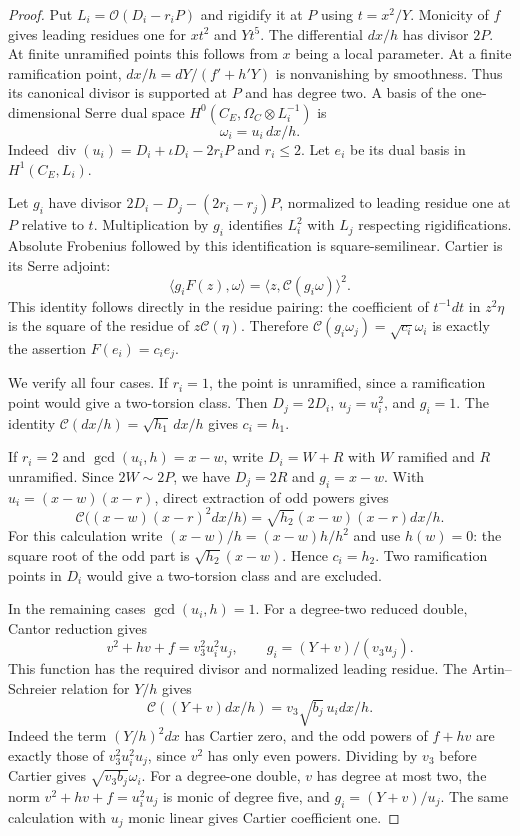 \begin{proof}
Put $L_i=\mathcal O(D_i-r_iP)$ and rigidify it at $P$ using
$t=x^2/Y$. Monicity of $f$ gives leading residues one for $xt^2$
and $Yt^5$. The differential $dx/h$ has divisor $2P$.
At finite unramified points this follows from $x$ being a local
parameter. At a finite ramification point,
$dx/h=dY/(f'+h'Y)$ is nonvanishing by smoothness.
Thus its canonical divisor is supported at $P$ and has degree two.
A basis of the one-dimensional Serre dual space
$H^0(C_E,\Omega_C\otimes L_i^{-1})$ is
\[
                            \omega_i=u_i\,dx/h.
\]
Indeed $\operatorname{div}(u_i)=D_i+\iota D_i-2r_iP$ and $r_i\le2$.
Let $e_i$ be its dual basis in $H^1(C_E,L_i)$.

Let $g_i$ have divisor $2D_i-D_j-(2r_i-r_j)P$, normalized to
leading residue one at $P$ relative to $t$.
Multiplication by $g_i$ identifies $L_i^2$ with $L_j$ respecting
rigidifications. Absolute Frobenius followed by this identification
is square-semilinear. Cartier is its Serre adjoint:
\[
 \langle g_iF(z),\omega\rangle
             =\langle z,\mathcal C(g_i\omega)\rangle^2.
\]
This identity follows directly in the residue pairing: the coefficient
of $t^{-1}dt$ in $z^2\eta$ is the square of the residue of
$z\mathcal C(\eta)$. Therefore
$\mathcal C(g_i\omega_j)=\sqrt{c_i}\omega_i$ is exactly the assertion
$F(e_i)=c_i e_j$.

We verify all four cases.
If $r_i=1$, the point is unramified, since a ramification point would
give a two-torsion class. Then $D_j=2D_i$, $u_j=u_i^2$, and $g_i=1$.
The identity $\mathcal C(dx/h)=\sqrt{h_1}\,dx/h$ gives $c_i=h_1$.

If $r_i=2$ and $\gcd(u_i,h)=x-w$, write $D_i=W+R$ with $W$
ramified and $R$ unramified. Since $2W\sim2P$, we have $D_j=2R$
and $g_i=x-w$. With $u_i=(x-w)(x-r)$, direct extraction of odd
powers gives
\[
 \mathcal C\bigl((x-w)(x-r)^2dx/h\bigr)
             =\sqrt{h_2}(x-w)(x-r)dx/h.
\]
For this calculation write $(x-w)/h=(x-w)h/h^2$ and use $h(w)=0$:
the square root of the odd part is $\sqrt{h_2}(x-w)$.
Hence $c_i=h_2$. Two ramification points in $D_i$ would give a
two-torsion class and are excluded.

In the remaining cases $\gcd(u_i,h)=1$.
For a degree-two reduced double, Cantor reduction gives
\[
 v^2+hv+f=v_3^2u_i^2u_j,\qquad
                     g_i=(Y+v)/(v_3u_j).
\]
This function has the required divisor and normalized leading residue.
The Artin--Schreier relation for $Y/h$ gives
\[
 \mathcal C((Y+v)dx/h)=v_3\sqrt{b_j}\,u_i dx/h.
\]
Indeed the term $(Y/h)^2dx$ has Cartier zero, and the odd powers of
$f+hv$ are exactly those of $v_3^2u_i^2u_j$, since $v^2$ has only
even powers. Dividing by $v_3$ before Cartier gives
$\sqrt{v_3b_j}\omega_i$.
For a degree-one double, $v$ has degree at most two, the norm
$v^2+hv+f=u_i^2u_j$ is monic of degree five, and
$g_i=(Y+v)/u_j$. The same calculation with $u_j$ monic linear
gives Cartier coefficient one.


\end{proof}

